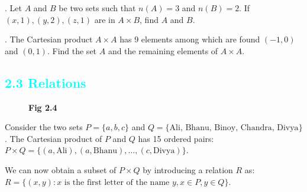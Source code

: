 \documentclass[11pt]{article}
\begin{document}
. Let $A$ and $B$ be two sets such that $n(A)=3$ and $n(B)=2$. If $(x, 1), (y, 2), (z, 1)$ are in $A\times B$, find $A$ and $B$.

. The Cartesian product $A \times A$ has 9 elements among which are found $(-1, 0)$ and $(0,1)$. Find the set $A$ and the remaining elements of $A \times A$.
\textcolor{cyan}{\section*{2.3 Relations}}

\begin{figure}
\centering
\vspace{-25pt} 
\caption*{\textbf{Fig 2.4}}
\end{figure}
Consider the two sets $P = \{a, b, c\}$ and $Q = \{\text{Ali, Bhanu, Binoy, Chandra, Divya}\}$. The Cartesian product of $P$ and $Q$ has 15 ordered pairs: $P \times Q = \{(a, \text{Ali}), (a, \text{Bhanu}), \dots, (c, \text{Divya})\}$. 

\vspace{0.5em}
We can now obtain a subset of $P \times Q$ by introducing a relation $R$ as:
$R = \{ (x,y) : x \text{ is the first letter of the name } y, x \in P, y \in Q \}$. 

\vspace{0.5em}
\end{document}
